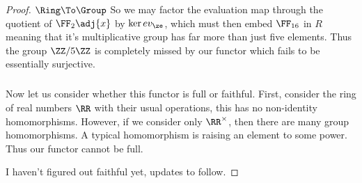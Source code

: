 \documentclass[main.tex]{subfiles}
\begin{document}
\begin{proof} {\(\Ring\To\Group\)}
	So we may factor the evaluation map through the quotient of \(\FF_2\adj{x}\)
	by \(\ker ev_\ze\), which must then embed \(\FF_{16}\) in \(R\) meaning that
	it's multiplicative group has far more than just five elements. Thus the
	group \(\ZZ/5\ZZ\) is completely missed by our functor which fails to be
	essentially surjective.

	\subparagraph{}
	Now let us consider whether this functor is full or faithful. First,
	consider the ring of real numbers \(\RR\) with their usual operations, this
	has no non-identity homomorphisms. However, if we consider only
	\(\RR^\times\), then there are many group homomorphisms. A typical
	homomorphism is raising an element to some power. Thus our functor cannot be
	full.

	I haven't figured out faithful yet, updates to follow.

\end{proof}
\end{document}
